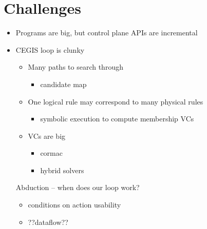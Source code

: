 






  
\section{Challenges}
\begin{itemize}
\item Programs are big, but control plane APIs are incremental
\item CEGIS loop is clunky
  \begin{itemize}
  \item Many paths to search through
    \begin{itemize} \item candidate map \end{itemize}
  \item One logical rule may correspond to many physical rules
    \begin{itemize} \item symbolic execution to compute membership VCs \end{itemize}
  \item VCs are big
    \begin{itemize}
    \item cormac
    \item hybrid solvers
    \end{itemize}
  \end{itemize}
Abduction -- when does our loop work?
  \begin{itemize}
  \item conditions on action usability
  \item ??dataflow??
  \end{itemize}
\end{itemize}

